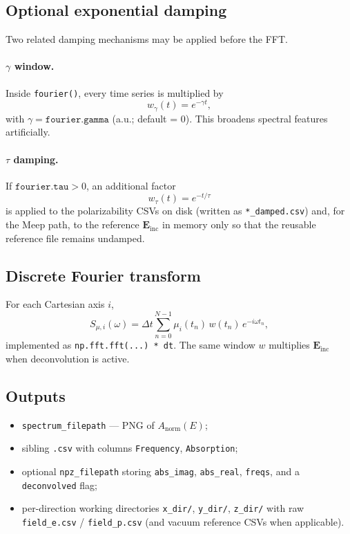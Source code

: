 \documentclass[11pt,a4paper]{article}
\begin{document}
\subsection{Optional exponential damping}

Two related damping mechanisms may be applied before the FFT.

\paragraph{$\gamma$ window.}
Inside \texttt{fourier()}, every time series is multiplied by
\begin{equation}
  w_\gamma(t) = e^{-\gamma t},
\end{equation}
with $\gamma = \texttt{fourier.gamma}$ (a.u.; default = 0). This broadens spectral
features artificially.

\paragraph{$\tau$ damping.}
If $\texttt{fourier.tau} > 0$, an additional factor
\begin{equation}
  w_\tau(t) = e^{-t/\tau}
\end{equation}
is applied to the polarizability CSVs on disk (written as
\texttt{*\_damped.csv}) and, for the Meep path, to the reference
$\mathbf{E}_{\mathrm{inc}}$ in memory only so that the reusable
reference file remains undamped.

\subsection{Discrete Fourier transform}

For each Cartesian axis $i$,
\begin{equation}
  S_{\mu,i}(\omega)
  =
  \Delta t \sum_{n=0}^{N-1}
  \mu_i(t_n)\, w(t_n)\, e^{-i\omega t_n},
  \label{eq:fft}
\end{equation}
implemented as \texttt{np.fft.fft(...) * dt}.  The same window $w$ multiplies
$\mathbf{E}_{\mathrm{inc}}$ when deconvolution is active.

\subsection{Outputs}

\begin{itemize}
  \item \texttt{spectrum\_filepath} --- PNG of $A_{\mathrm{norm}}(E)$;
  \item sibling \texttt{.csv} with columns \texttt{Frequency}, \texttt{Absorption};
  \item optional \texttt{npz\_filepath} storing
        \texttt{abs\_imag}, \texttt{abs\_real}, \texttt{freqs}, and a
        \texttt{deconvolved} flag;
  \item per-direction working directories \texttt{x\_dir/}, \texttt{y\_dir/},
        \texttt{z\_dir/} with raw \texttt{field\_e.csv} /
        \texttt{field\_p.csv} (and vacuum reference CSVs when applicable).
\end{itemize}
\end{document}
